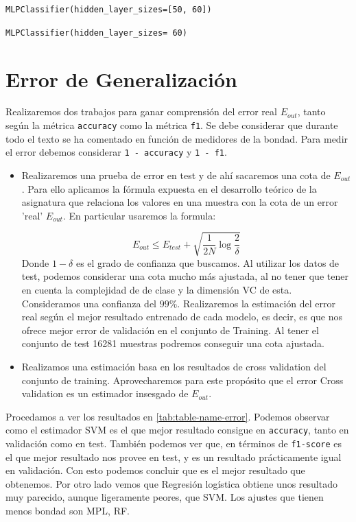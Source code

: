 \documentclass[11pt,a4paper]{article}
\begin{document}
{\begin{center}
    \texttt{MLPClassifier(hidden\_layer\_sizes=[50, 60])}
  \end{center}}


{\begin{center}
    \texttt{MLPClassifier(hidden\_layer\_sizes= 60)}
  \end{center}}  
 
\section{ Error de Generalización}

Realizaremos dos trabajos para ganar comprensión del error real $E_{out}$, tanto según la métrica \texttt{accuracy} como la métrica \texttt{f1}. Se debe considerar que durante todo el texto se ha comentado en función de medidores de la bondad. Para medir el error debemos considerar \texttt{1 - accuracy} y \texttt{1 - f1}.

\begin{itemize}
  \item  Realizaremos una prueba de error en test y de ahí sacaremos una cota de $E_{out}$. Para ello aplicamos la fórmula expuesta en el desarrollo teórico de la asignatura que relaciona los valores en una muestra con la cota de un error ’real’ $E_{out}$. En particular usaremos la formula:
	
	$$E_{out} \le E_{test} + \sqrt{\frac{1}{2N}\log\frac{2}{\delta}}$$
	Donde $1-\delta$ es el grado de confianza que buscamos. Al utilizar los datos de test, podemos considerar una cota mucho más ajustada, al no tener que tener en cuenta la complejidad de de clase y la dimensión VC de esta. Consideramos una confianza del $99\%$. Realizaremos la estimación del error real según el mejor resultado entrenado de cada modelo, es decir, es que nos ofrece mejor error de validación en el conjunto de Training. Al tener el conjunto de test 16281 muestras podremos conseguir una cota ajustada.

        
  \item Realizamos una estimación  basa en los resultados de cross validation del conjunto de training.  Aprovecharemos para este propósito que el error Cross validation es un estimador insesgado de $E_{out}$. 

\end{itemize}
Procedamos a ver los resultados en \ref{tab:table-name-error}. Podemos observar como el estimador SVM es el que mejor resultado consigue en \texttt{accuracy}, tanto en validación como en test. También podemos ver que, en términos de \texttt{f1-score} es el que mejor resultado nos provee en test, y es un resultado prácticamente igual en validación. Con esto podemos concluir que es el mejor resultado que obtenemos. Por otro lado vemos que Regresión logística obtiene unos resultado muy parecido, aunque ligeramente peores, que SVM. Los ajustes que tienen menos bondad son MPL, RF.
\end{document}
